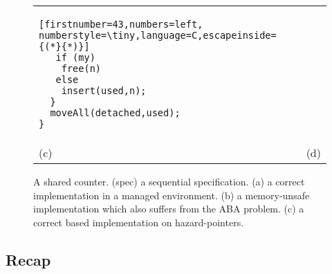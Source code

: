 \begin{figure}[t]
\begin{center}
\begin{tabular}{ll}
\begin{minipage}{42mm}
{\begin{lstlisting}[firstnumber=43,numbers=left, numberstyle=\tiny,language=C,escapeinside={(*}{*)}]
   if (my) 
    free(n)
   else    
    insert(used,n);
  }  
  moveAll(detached,used);
}
\end{lstlisting}
}
\end{minipage}
\\
\qquad(c) & \qquad(d)
\end{tabular}
\end{center}
\caption{A shared counter. (spec) a sequential specification. 
(a) a correct implementation in a managed environment. 
(b) a memory-unsafe implementation which also suffers from the ABA problem. 
(c) a correct based implementation on hazard-pointers.}
\label{fig:running}
\end{figure}



\subsection{Recap}